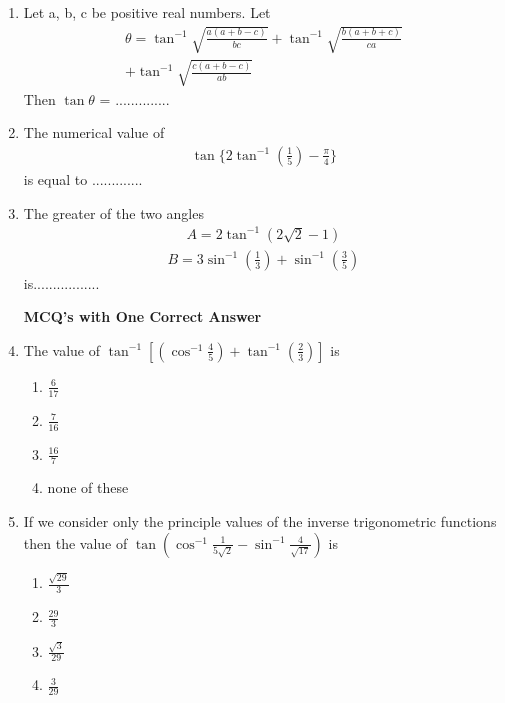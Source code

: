 \renewcommand{\theequation}{\theenumi}
\begin{enumerate}[label=\arabic*.,ref=\thesubsection.\theenumi]

\item Let a, b, c be positive real numbers. Let
\begin{align*}
\theta = \tan^{-1}\sqrt{\frac{a(a + b - c)}{bc}} + \tan^{-1} \sqrt{ \frac{b(a + b + c) }{ca}}\\ 
+ \tan^{-1}\sqrt{\frac{c(a +  b - c)}{ab}}
\end{align*}
Then $\tan \theta$ = ..............

\item The numerical value of 
\begin{align*}
\tan \{2\tan^{-1}(\frac{1}{5}) - \frac{\pi}{4}\}
\end{align*} 
is equal to .............

\item The greater of the two angles 
\begin{align*}
A = 2\tan^{-1}(2\sqrt{2} - 1)
\end{align*}
\begin{align*}
B = 3\sin^{-1}(\frac{1}{3}) + \sin^{-1}(\frac{3}{5})
\end{align*}
is.................

\textbf{MCQ's with One Correct Answer}

\item The value of $\tan^{-1}[(\cos^{-1}\frac{4}{5}) + \tan^{-1}(\frac{2}{3})]$ is
\begin{enumerate}
\item $\frac{6}{17}$
\item $\frac{7}{16}$
\item $\frac{16}{7}$
\item none of these
\end{enumerate}

\item If we consider only the principle values of the inverse trigonometric functions then the value of
$\tan(\cos^{-1}\frac{1}{5\sqrt{2}} - \sin^{-1}\frac{4}{\sqrt{17}})$ is
\begin{enumerate}
\item $\frac{\sqrt{29}}{3}$
\item $\frac{29}{3}$
\item $\frac{\sqrt{3}}{29}$
\item $\frac{3}{29}$
\end{enumerate}


\end{enumerate}
